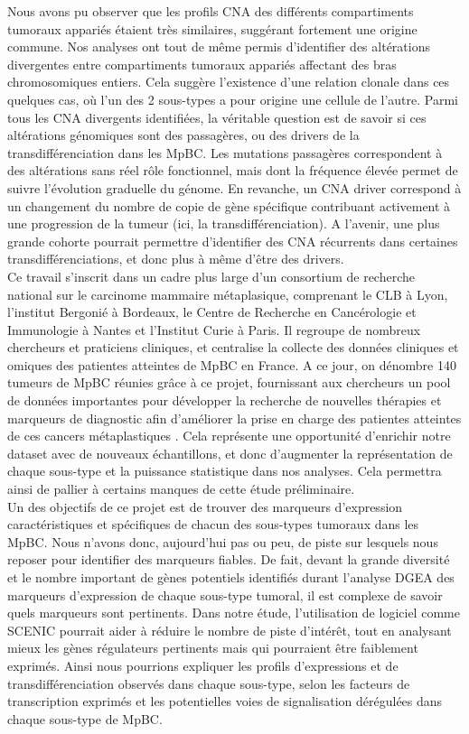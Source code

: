 \documentclass[11pt]{article}
\begin{document}
Nous avons pu observer que les profils CNA des différents compartiments tumoraux appariés étaient très similaires, suggérant fortement une origine commune. Nos analyses ont tout de même permis d’identifier des altérations divergentes entre compartiments tumoraux appariés affectant des bras chromosomiques entiers. Cela suggère l’existence d’une relation clonale dans ces quelques cas, où l’un des 2 sous-types a pour origine une cellule de l’autre. Parmi tous les CNA divergents identifiées, la véritable question est de savoir si ces altérations génomiques sont des passagères, ou des drivers de la transdifférenciation dans les MpBC. Les mutations passagères correspondent à des altérations sans réel rôle fonctionnel, mais dont la fréquence élevée permet de suivre l’évolution graduelle du génome. En revanche, un CNA driver correspond à un changement du nombre de copie de gène spécifique contribuant activement à une progression de la tumeur (ici, la transdifférenciation). A l’avenir, une plus grande cohorte pourrait permettre d’identifier des CNA récurrents dans certaines transdifférenciations, et donc plus à même d’être des drivers.\\

Ce travail s’inscrit dans un cadre plus large d’un consortium de recherche national sur le carcinome mammaire métaplasique, comprenant le CLB à Lyon, l’institut Bergonié à Bordeaux, le Centre de Recherche en Cancérologie et Immunologie à Nantes et l’Institut Curie à Paris. Il regroupe de nombreux chercheurs et praticiens cliniques, et centralise la collecte des données cliniques et omiques des patientes atteintes de MpBC en France. A ce jour, on dénombre 140 tumeurs de MpBC réunies grâce à ce projet, fournissant aux chercheurs un pool de données importantes pour développer la recherche de nouvelles thérapies et marqueurs de diagnostic afin d’améliorer la prise en charge des patientes atteintes de ces cancers métaplastiques \cite{bergonie}. Cela représente une opportunité d’enrichir notre dataset avec de nouveaux échantillons, et donc d’augmenter la représentation de chaque sous-type et la puissance statistique dans nos analyses. Cela permettra ainsi de pallier à certains manques de cette étude préliminaire.\\

Un des objectifs de ce projet est de trouver des marqueurs d’expression caractéristiques et spécifiques de chacun des sous-types tumoraux dans les MpBC. Nous n’avons donc, aujourd’hui pas ou peu, de piste sur lesquels nous reposer pour identifier des marqueurs fiables. De fait, devant la grande diversité et le nombre important de gènes potentiels identifiés durant l’analyse DGEA des marqueurs d’expression de chaque sous-type tumoral, il est complexe de savoir quels marqueurs sont pertinents. Dans notre étude, l’utilisation de logiciel comme SCENIC \cite{Aibar2017SCENIC} pourrait aider à réduire le nombre de piste d’intérêt, tout en analysant mieux les gènes régulateurs pertinents mais qui pourraient être faiblement exprimés. Ainsi nous pourrions expliquer les profils d’expressions et de transdifférenciation observés dans chaque sous-type, selon les facteurs de transcription exprimés et les potentielles voies de signalisation dérégulées dans chaque sous-type de MpBC.\\
\end{document}
